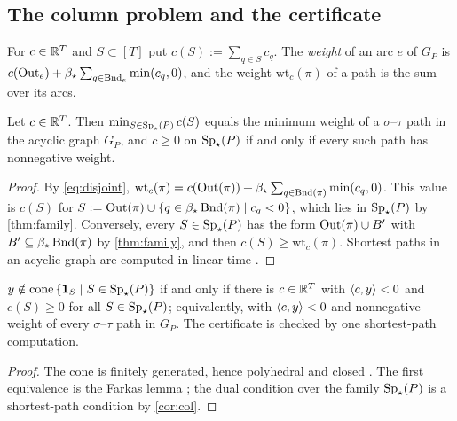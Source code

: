 \subsection{The column problem and the certificate}

For $c\in\mathbb{R}^T$ and $S\subset[T]$ put $c(S):=\sum_{q\in S}c_q$. The \emph{weight} of an arc $e$ of $G_P$ is $c(\operatorname{Out}_e)+\beta_\star\sum_{q\in\operatorname{Bnd}_e}\min(c_q,0)$, and the weight $\mathrm{wt}_c(\pi)$ of a path is the sum over its arcs.

\begin{corollary}\label{cor:col}
Let $c\in\mathbb{R}^T$. Then $\min_{S\in\operatorname{Sp}_\star(P)}c(S)$ equals the minimum weight of a $\sigma$--$\tau$ path in the acyclic graph $G_P$, and $c\ge0$ on $\operatorname{Sp}_\star(P)$ if and only if every such path has nonnegative weight.
\end{corollary}

\begin{proof}
By \eqref{eq:disjoint}, $\mathrm{wt}_c(\pi)=c(\operatorname{Out}(\pi))+\beta_\star\sum_{q\in\operatorname{Bnd}(\pi)}\min(c_q,0)$. This value is $c(S)$ for $S:=\operatorname{Out}(\pi)\cup\left\{ q\in\beta_\star\operatorname{Bnd}(\pi)\mid c_q<0 \right\}$, which lies in $\operatorname{Sp}_\star(P)$ by \cref{thm:family}. Conversely, every $S\in\operatorname{Sp}_\star(P)$ has the form $\operatorname{Out}(\pi)\cup B'$ with $B'\subseteq\beta_\star\operatorname{Bnd}(\pi)$ by \cref{thm:family}, and then $c(S)\ge\mathrm{wt}_c(\pi)$. Shortest paths in an acyclic graph are computed in linear time \citep[Ch.~4]{AhujaMagnantiOrlin1993}.
\end{proof}

\begin{corollary}\label{cor:farkas}
$y\notin\operatorname{cone}\left\{ \mathbf 1_{S}\mid S\in\operatorname{Sp}_\star(P) \right\}$ if and only if there is $c\in\mathbb{R}^T$ with $\langle c, y\rangle<0$ and $c(S)\ge0$ for all $S\in\operatorname{Sp}_\star(P)$; equivalently, with $\langle c, y\rangle<0$ and nonnegative weight of every $\sigma$--$\tau$ path in $G_P$. The certificate is checked by one shortest-path computation.
\end{corollary}

\begin{proof}
The cone is finitely generated, hence polyhedral and closed \citep[Cor.~7.1a]{Schrijver1986}. The first equivalence is the Farkas lemma \citep[Cor.~7.1d]{Schrijver1986}; the dual condition over the family $\operatorname{Sp}_\star(P)$ is a shortest-path condition by \cref{cor:col}.
\end{proof}
